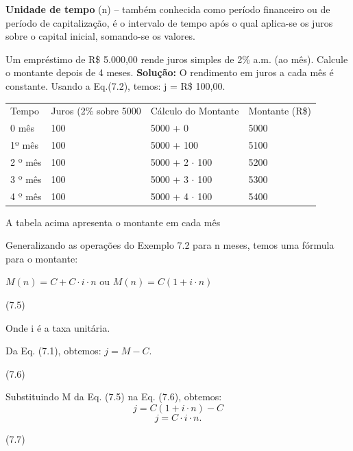 \textbf{Unidade de tempo} (n) – também conhecida como período financeiro ou de período de capitalização, é o intervalo de tempo após o qual aplica-se os juros sobre o capital inicial, somando-se os valores.

\begin{texemplo}
	Um empréstimo de R\$ 5.000,00 rende juros simples de 2\% a.m. (ao mês). Calcule o montante depois de 4 meses.
	\textbf{Solução:} O rendimento em juros a cada mês é constante. Usando a Eq.(7.2), temos: j = R\$ 100,00. 

	\begin{table}[H]
		\centering
		\begin{tabular}{llll}
		Tempo   & Juros (2\% sobre 5000 & Cálculo do Montante & Montante (R\$) \\
		0 mês   & 100                   & 5000 + 0            & 5000           \\
		1º mês  & 100                   & 5000 + 100          & 5100           \\
		2 º mês & 100                   & 5000 + 2 $\cdot$ 100      & 5200           \\
		3 º mês & 100                   & 5000 + 3 $\cdot$ 100       & 5300           \\
		4 º mês & 100                   & 5000 + 4 $\cdot$ 100      & 5400          
		\end{tabular}
	\end{table}

A tabela acima apresenta o montante em cada mês \qedsymbol{}

\end{texemplo}

Generalizando as operações do Exemplo 7.2 para n meses, temos uma fórmula para o montante: 

$M(n) = C + C \cdot i \cdot n$ ou $M(n) = C (1 + i \cdot n)$
\begin{flushright}
	(7.5)
\end{flushright}

Onde i é a taxa unitária.

Da Eq. (7.1), obtemos:
$j = M - C$.
\begin{flushright}
	(7.6)
\end{flushright}

Substituindo M da Eq. (7.5) na Eq. (7.6), obtemos:
$$j=C(1 + i \cdot n) -C$$
$$j=C \cdot i \cdot n.$$
\begin{flushright}
	(7.7)
\end{flushright}

